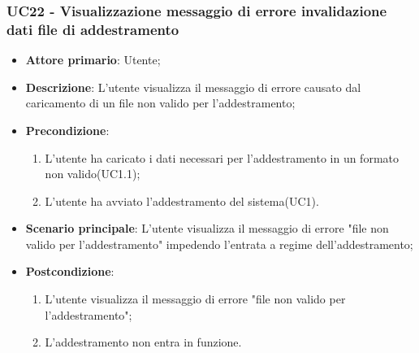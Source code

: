 \subsubsection{UC22 - Visualizzazione messaggio di errore invalidazione dati file di addestramento}
\label{sssec:uc17}
\begin{itemize}
  \item \textbf{Attore primario}: Utente;
  \item \textbf{Descrizione}: L'utente visualizza il messaggio di errore causato dal caricamento di un file non valido per l'addestramento;
  \item \textbf{Precondizione}:
  \begin{enumerate}
		\item L'utente ha caricato i dati necessari per l'addestramento in un formato non valido(UC1.1);
		\item L'utente ha avviato l'addestramento del sistema(UC1).
	\end{enumerate}
  \item \textbf{Scenario principale}: L'utente visualizza il messaggio di errore "file non valido per l'addestramento" impedendo l'entrata a regime dell'addestramento;
  \item \textbf{Postcondizione}:
  \begin{enumerate}
		\item L'utente visualizza il messaggio di errore "file non valido per l'addestramento";
		\item L'addestramento non entra in funzione.
	\end{enumerate}
\end{itemize}
